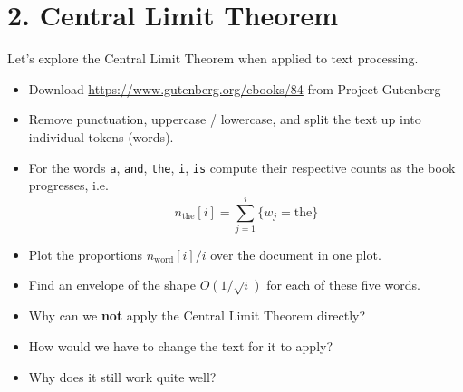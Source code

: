 \documentclass[11pt]{article}
\providecommand{\tightlist}{%
      \setlength{\itemsep}{0pt}\setlength{\parskip}{0pt}}
\begin{document}
    \hypertarget{central-limit-theorem}{%
\section{2. Central Limit Theorem}\label{central-limit-theorem}}

Let's explore the Central Limit Theorem when applied to text processing.

\begin{itemize}
\tightlist
\item
  Download
  \href{https://www.gutenberg.org/files/84/84-0.txt}{https://www.gutenberg.org/ebooks/84}
  from Project Gutenberg
\item
  Remove punctuation, uppercase / lowercase, and split the text up into
  individual tokens (words).
\item
  For the words \texttt{a}, \texttt{and}, \texttt{the}, \texttt{i},
  \texttt{is} compute their respective counts as the book progresses,
  i.e. \[n_\mathrm{the}[i] = \sum_{j = 1}^i \{w_j = \mathrm{the}\}\]
\item
  Plot the proportions \(n_\mathrm{word}[i] / i\) over the document in
  one plot.
\item
  Find an envelope of the shape \(O(1/\sqrt{i})\) for each of these five
  words.
\item
  Why can we \textbf{not} apply the Central Limit Theorem directly?
\item
  How would we have to change the text for it to apply?
\item
  Why does it still work quite well?
\end{itemize}
\end{document}
